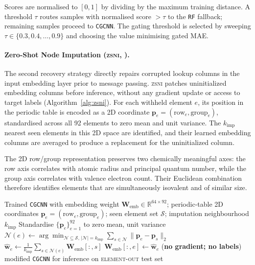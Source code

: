 \documentclass[final,5p,twocolumn,10pt]{elsarticle}
\newcommand{\elout}{\textsc{element-out}}
\newcommand{\cgcnn}{\texttt{CGCNN}}
\newcommand{\rf}{\texttt{RF}}
\newcommand{\zsni}{\textsc{zsni}}
\begin{document}
Scores are normalised to $[0,1]$ by dividing by the maximum training distance.
A threshold $\tau$ routes samples with normalised score $> \tau$ to the
\rf{} fallback; remaining samples proceed to \cgcnn{}. The gating
threshold is selected by sweeping $\tau \in \{0.3, 0.4, \ldots, 0.9\}$
and choosing the value minimising gated MAE.

\paragraph{Zero-Shot Node Imputation (\zsni{}, \label{sec:zsni}).}
The second recovery strategy directly repairs corrupted lookup columns
in the input embedding layer prior to message passing. \zsni{} patches
uninitialized embedding columns before inference, without any gradient
update or access to target labels (Algorithm~\ref{alg:zsni}). For each
withheld element $e$, its position in the periodic table is encoded as a 2D
coordinate $\bm{p}_e = (\text{row}_e, \text{group}_e)$, standardised across
all 92 elements to zero mean and unit variance. The $k_{\text{imp}}$ nearest
seen elements in this 2D space are identified, and their learned embedding
columns are averaged to produce a replacement for the uninitialized column.

The 2D row/group representation preserves two chemically meaningful axes:
the row axis correlates with atomic radius and principal quantum number,
while the group axis correlates with valence electron count. Their
Euclidean combination therefore identifies elements that are simultaneously
isovalent and of similar size.

\begin{algorithm}[ht]
\caption{Zero-Shot Node Imputation (\zsni{})}
\label{alg:zsni}
\begin{algorithmic}[1]
\Require Trained \cgcnn{} with embedding weight $\bm{W}_{\text{emb}} \in \mathbb{R}^{64 \times 92}$;
  periodic-table 2D coordinates $\bm{p}_e = (\text{row}_e, \text{group}_e)$;
  seen element set $\mathcal{S}$; imputation neighbourhood $k_{\text{imp}}$
\State Standardise $\{\bm{p}_e\}_{e=1}^{92}$ to zero mean, unit variance
  \State $\mathcal{N}(e) \gets \arg\!\min_{\mathcal{N} \subseteq \mathcal{S},\, |\mathcal{N}|=k_{\text{imp}}} \sum_{s \in \mathcal{N}} \|\bm{p}_e - \bm{p}_s\|_2$
  \State $\hat{\bm{w}}_e \gets \frac{1}{k_{\text{imp}}} \sum_{s \in \mathcal{N}(e)} \bm{W}_{\text{emb}}[:,s]$
  \State $\bm{W}_{\text{emb}}[:,e] \gets \hat{\bm{w}}_e$ \quad (\textbf{no gradient; no labels})
\EndFor
\State \Return modified \cgcnn{} for inference on \elout{} test set
\end{algorithmic}
\end{algorithm}
\end{document}
